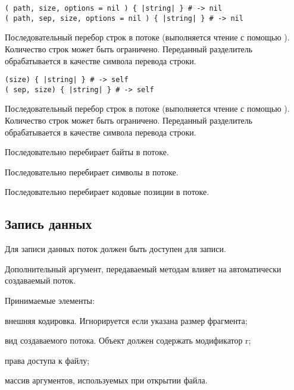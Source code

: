 \begin{methodlist}
  \verb!( path, size, options = nil ) { |string| } # -> nil!
  \\\verb!( path, sep, size, options = nil ) { |string| } # -> nil!
  
  Последовательный перебор строк в потоке (выполняется чтение с помощью ). Количество строк может быть ограничено. Переданный разделитель обрабатывается в качестве символа перевода строки.
 
  \verb!(size) { |string| } # -> self!
  \\\verb!( sep, size) { |string| } # -> self!

  Последовательный перебор строк в потоке (выполняется чтение с помощью ). Количество строк может быть ограничено. Переданный разделитель обрабатывается в качестве символа перевода строки.
 
  Последовательно перебирает байты в потоке.
 

  Последовательно перебирает символы в потоке. 
 
  Последовательно перебирает кодовые позиции в потоке.
 \end{methodlist} 

\subsection{Запись данных} 

Для записи данных поток должен быть доступен для записи.

Дополнительный аргумент, передаваемый методам влияет на автоматически создаваемый поток.
\begin{keylist}{Принимаемые элементы:}
  
   внешняя кодировка. Игнорируется если указана размер фрагмента;
  
   вид создаваемого потока. Объект должен содержать модификатор r;
  
   права доступа к файлу;
  
   массив аргументов, используемых при открытии файла.
\end{keylist}

